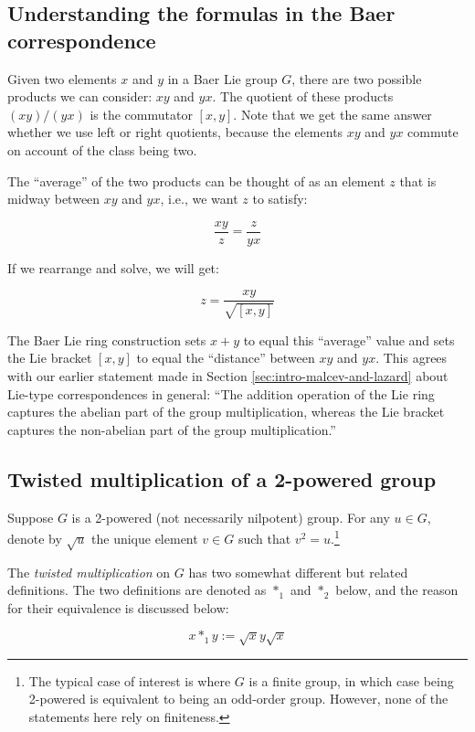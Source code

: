 \documentclass{ucetd}
\begin{document}
\subsection{Understanding the formulas in the Baer correspondence}\label{sec:mean-deviation}

Given two elements $x$ and $y$ in a Baer Lie group $G$, there are two
possible products we can consider: $xy$ and $yx$. The quotient of
these products $(xy)/(yx)$ is the commutator $[x,y]$. Note that we get
the same answer whether we use left or right quotients, because the
elements $xy$ and $yx$ commute on account of the class being two.

The ``average'' of the two products can be thought of as an element
$z$ that is midway between $xy$ and $yx$, i.e., we want $z$ to
satisfy:

$$\frac{xy}{z} = \frac{z}{yx}$$

If we rearrange and solve, we will get:

$$z = \frac{xy}{\sqrt{[x,y]}}$$

The Baer Lie ring construction sets $x + y$ to equal this ``average''
value and sets the Lie bracket $[x,y]$ to equal the ``distance''
between $xy$ and $yx$. This agrees with our earlier statement made in
Section \ref{sec:intro-malcev-and-lazard} about Lie-type
correspondences in general: ``The addition operation of the Lie ring
captures the abelian part of the group multiplication, whereas the Lie
bracket captures the non-abelian part of the group multiplication.''

\subsection{Twisted multiplication of a 2-powered group}\label{sec:twisted-multiplication}

Suppose $G$ is a 2-powered (not necessarily nilpotent) group. For any
$u \in G$, denote by $\sqrt{u}$ the unique element $v \in G$ such that
$v^2 = u$.\footnote{The typical case of interest is where $G$ is a
  finite group, in which case being 2-powered is equivalent to being
  an odd-order group. However, none of the statements here rely on
  finiteness.}

The {\em twisted multiplication} on $G$ has two somewhat different but
related definitions. The two definitions are denoted as $*_1$ and
$*_2$ below, and the reason for their equivalence is discussed below:

$$x *_1 y := \sqrt{x}y\sqrt{x}$$
\end{document}
